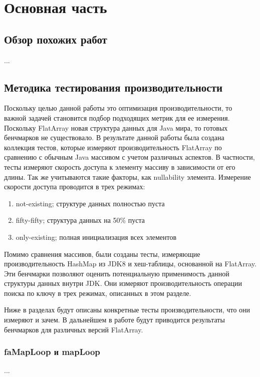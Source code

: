 \section{Основная часть}
\subsection{Обзор похожих работ}
...

\subsection{Методика тестирования производительности}
Поскольку целью данной работы это оптимизация производительности, то важной задачей становится подбор подходящих метрик для ее измерения. Поскольку FlatArray новая структура данных для Java мира, то готовых бенчмарков не существовало. 
В результате данной работы была создана коллекция тестов, которые измеряют производительность FlatArray по сравнению с обычным Java массивом с учетом различных аспектов.
В частности, тесты измеряют скорость доступа к элементу массиву в зависимости от его длины. Так же учитываются такие факторы, как nullability элемента. Измерение скорости доступа проводится в трех режимах:
\begin{enumerate}
	\item not-existing; структуре данных полностью пуста
	\item fifty-fifty; структура данных на 50\% пуста
	\item only-existing; полная инициализация всех элементов
\end{enumerate}
Помимо сравнения массивов, были созданы тесты, измеряющие производительность HashMap из JDK8 и хеш-таблицы, основанной на FlatArray. Эти бенчмарки позволяют оценить потенциальную применимость данной структуры данных внутри JDK. Они измеряют производительность операции поиска по ключу в трех режимах, описанных в этом разделе.
\par
Ниже в разделах будут описаны конкретные тесты производительности, что они измеряют и зачем. В дальнейшем в работе будут приводится результаты бенчмарков для различных версий FlatArray.
\subsubsection{faMapLoop и mapLoop}
...
